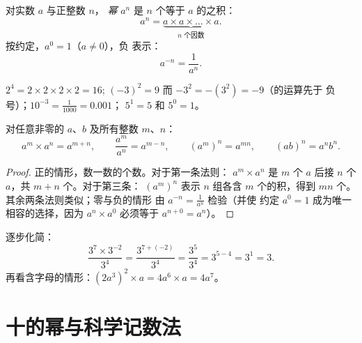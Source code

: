 \begin{definition}[幂]\label{def:g9:fractions:power}
对实数 $a$ 与正整数 $n$，
\emph{幂} $a^n$ 是 $n$ 个等于
$a$ 的之积：
\[
a^n = \underbrace{a \times a \times \dots \times a}_{n \text{ 个因数}} .
\]
按约定，$a^0 = 1$（$a \neq 0$），负
表示：
\[
a^{-n} = \frac{1}{a^n}.
\]
\end{definition}

\begin{example}
$2^4 = 2 \times 2 \times 2 \times 2 = 16$; \quad
$(-3)^2 = 9$ 而 $-3^2 = -(3^2) = -9$（的运算先于
负号）；\quad $10^{-3} = \frac{1}{1000} = 0.001$； \quad
$5^1 = 5$ 和 $5^0 = 1$。
\end{example}

\begin{theorem}[指数运算法则]\label{thm:g9:fractions:rules}
对任意非零的 $a$、$b$ 及所有整数 $m$、$n$：
\[
a^m \times a^n = a^{m+n},
\qquad
\frac{a^m}{a^n} = a^{m-n},
\qquad
\left(a^m\right)^n = a^{mn},
\qquad
(ab)^n = a^n b^n .
\]
\end{theorem}

\begin{proof}
正的情形，数一数的个数。对于第一条法则：
$a^m \times a^n$ 是 $m$ 个 $a$ 后接 $n$ 个 $a$，共
$m + n$ 个。对于第三条：
$\left(a^m\right)^n$ 表示 $n$ 组各含 $m$ 个的积，得到
$mn$ 个。其余两条法则类似；零与负的情形
由 $a^{-n} = \frac{1}{a^n}$ 检验（并使
约定 $a^0 = 1$ 成为唯一相容的选择，因为
$a^n \times a^0$ 必须等于 $a^{n+0} = a^n$）。
\end{proof}

\begin{example}\label{ex:g9:fractions:rules}
逐步化简：
\[
\frac{3^7 \times 3^{-2}}{3^4}
= \frac{3^{7 + (-2)}}{3^4}
= \frac{3^5}{3^4}
= 3^{5-4} = 3^1 = 3 .
\]
再看含字母的情形：$(2a^3)^2 \times a = 4 a^6 \times a = 4a^7$。
\end{example}

\section{十的幂与科学记数法}

